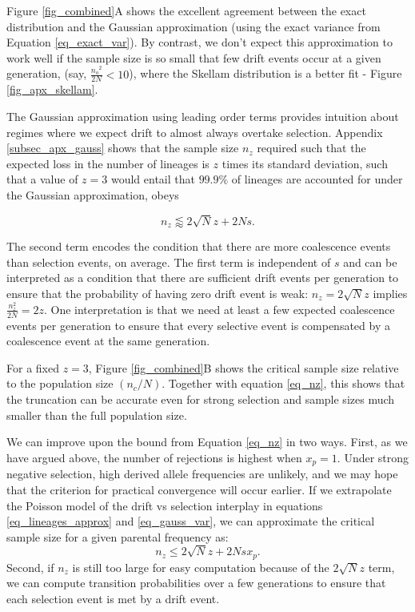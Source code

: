 \documentclass[review,nonatbib]{elsarticle}
\begin{document}
Figure \ref{fig_combined}A shows the excellent agreement between the exact distribution and the
Gaussian approximation (using the exact variance from Equation \ref{eq_exact_var}). By contrast,
we don't expect this approximation to work well if the sample size is so small that few drift
events occur at a given generation, (say, $\frac{{n_o}^2}{2N} < 10$), where the Skellam
distribution is a better fit - Figure \ref{fig_apx_skellam}.

The Gaussian approximation using leading order terms provides intuition about regimes where we
expect drift to almost always overtake selection.  Appendix \ref{subsec_apx_gauss} shows that the sample size
$n_z$ required such that the expected loss in the number of lineages is $z$ times its standard deviation,
such that a value of $z=3$ would entail that $99.9\%$ of lineages are accounted for under the Gaussian approximation,
obeys

\begin{equation}
  n_z \lessapprox 2 \sqrt{N} z + 2N s.
\label{eq_nz}
\end{equation}


The second term
encodes the condition that there are more coalescence events than selection events, on average. The
first term is independent of $s$ and can be interpreted as a condition that there are sufficient
drift events per generation to ensure that the probability of having zero drift event is weak: $n_z
= 2 \sqrt N z$ implies $\frac{n_z^2}{2N}= 2 z$. One interpretation is that we need at least a few
expected coalescence events per generation to ensure that every selective event is compensated by a
coalescence event at the same generation.

 For a fixed $z=3$, Figure \ref{fig_combined}B shows the critical sample size relative to the population size
 $(n_c/N)$. Together with equation \ref{eq_nz}, this shows
that the truncation can be accurate even for strong selection and sample sizes much smaller than
the full population size.

We can improve upon the bound from Equation \eqref{eq_nz} in two ways.
First, as we have argued above, the number of rejections is highest when $x_p=1$.
Under strong  negative selection, high derived allele frequencies are unlikely, and we may hope that the
criterion for practical convergence will occur earlier.
If we extrapolate the Poisson model of the drift vs selection interplay in equations \eqref{eq_lineages_approx} and \eqref{eq_gauss_var},
we can approximate the critical sample size for a given parental frequency as:
\begin{equation*}
  n_z \leq 2 \sqrt{N} z + 2Nsx_p.
\end{equation*}
Second, if $n_z$ is still too large for easy computation because of the $2 \sqrt{N} z$ term, we
can compute transition probabilities over a few generations to ensure that each selection event is met by a drift event.
\end{document}
